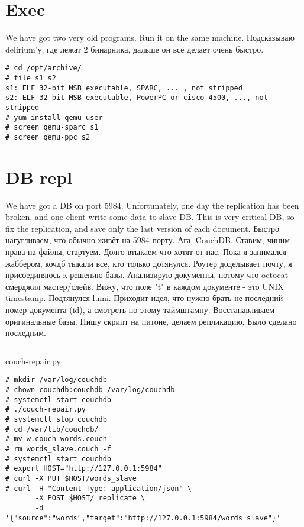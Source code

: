 \documentclass[a4paper,10pt]{report}
\begin{document}
\chapter{Exec}
We have got two very old programs. Run it on the same machine.
\newline\newline
Подсказываю delirium'у, где лежат 2 бинарника, дальше он всё делает очень быстро.
\begin{verbatim}
# cd /opt/archive/
# file s1 s2
s1: ELF 32-bit MSB executable, SPARC, ... , not stripped
s2: ELF 32-bit MSB executable, PowerPC or cisco 4500, ..., not stripped
# yum install qemu-user
# screen qemu-sparc s1
# screen qemu-ppc s2
\end{verbatim}

\chapter{DB repl}
We have got a DB on port 5984. Unfortunately, one day the replication has been broken, and one client write some data to slave DB.
\newline  
This is very critical DB, so fix the replication, and save only the last version of each document.
\newline\newline
Быстро нагугливаем, что обычно живёт на 5984 порту. Ага, CouchDB. Ставим, чиним права на файлы, стартуем. Долго втыкаем что хотят от нас.
Пока я занимался жаббером, кочдб тыкали все, кто только дотянулся. Роутер доделывает почту, я присоединяюсь к решению базы.
Анализирую документы, потому что octocat смерджил мастер/слейв. Вижу, что поле "t" в каждом документе - это UNIX timestamp.
Подтянулся lumi. Приходит идея, что нужно брать не последний номер документа (id), а смотреть по этому таймштампу. Восстанавливаем оригинальные базы.
\newline
Пишу скрипт на питоне, делаем репликацию.
\newline
Было сделано последним.
\begin{listing}[H]
  \inputminted[linenos=true, fontsize=\scriptsize, samepage=true]{python}{couch-repair.py}
  \caption{couch-repair.py}
  \label{lst:couch-repair.py}
\end{listing}
\begin{verbatim}
# mkdir /var/log/couchdb
# chown couchdb:couchdb /var/log/couchdb
# systemctl start couchdb
# ./couch-repair.py
# systemctl stop couchdb
# cd /var/lib/couchdb/
# mv w.couch words.couch
# rm words_slave.couch -f
# systemctl start couchdb
# export HOST="http://127.0.0.1:5984"
# curl -X PUT $HOST/words_slave
# curl -H "Content-Type: application/json" \
       -X POST $HOST/_replicate \
       -d '{"source":"words","target":"http://127.0.0.1:5984/words_slave"}'
\end{verbatim}
\end{document}
